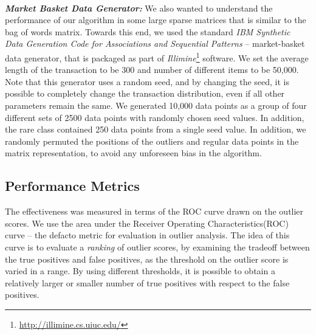  \\
{\bf\em  Market Basket Data Generator:} We also wanted to
understand the performance of our algorithm in some large sparse
matrices that is similar to the bag of words matrix. Towards this end, we used the standard {\em
IBM Synthetic Data Generation Code for Associations and Sequential
Patterns} -- market-basket data generator, that is packaged as part
of {\em Illimine}\footnote{\url{http://illimine.cs.uiuc.edu/}}
software. We set the average length of the transaction to be 300 and
number of different items to be 50,000. Note that this generator
uses a random seed, and by changing the seed, it is possible to
completely change the transaction distribution, even if all other
parameters remain the same. We generated 10,000 data points as a
group of four different  sets of 2500 data points with randomly
chosen  seed values. In addition, the rare class contained 250 data
points from a single seed value.  In addition, we randomly permuted
the positions of the outliers and regular data points in the matrix
representation, to avoid any unforeseen bias in the algorithm.

\subsection{Performance Metrics}
The effectiveness was measured in terms of the ROC curve drawn on
the outlier scores. We use the area under the Receiver Operating
Characteristics(ROC) curve -- the defacto metric for evaluation in
outlier analysis. The idea of this curve is to evaluate a {\em
ranking} of outlier scores, by examining the tradeoff between the
true positives and false positives, as the threshold on the outlier
score is varied in a range. By using different thresholds, it is
possible to obtain a relatively larger or smaller number of true
positives with respect to the false positives.

